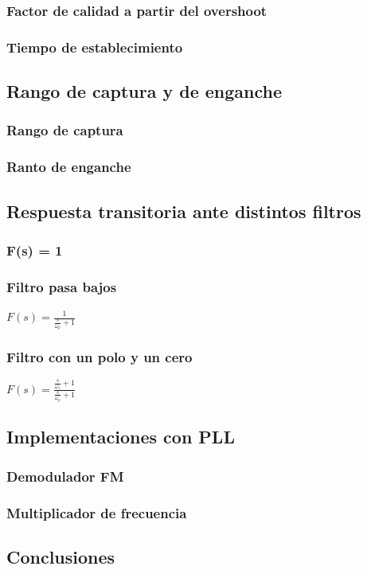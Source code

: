 	\subsubsection{Factor de calidad a partir del overshoot}

	\subsubsection{Tiempo de establecimiento}

\subsection{Rango de captura y de enganche}

	\subsubsection{Rango de captura}

	\subsubsection{Ranto de enganche}

\subsection{Respuesta transitoria ante distintos filtros}

	\subsubsection{F(s) = 1}
		
	\subsubsection{Filtro pasa bajos}
	
	$F(s) = \frac{1}{\frac{s}{\omega_p} + 1}$
	
	\subsubsection{Filtro con un polo y un cero}
	$F(s) = \frac{\frac{s}{\omega_z} + 1}{\frac{s}{\omega_p} + 1}$

\subsection{Implementaciones con PLL}

	\subsubsection{Demodulador FM }
	
	\subsubsection{Multiplicador de frecuencia}

\subsection{Conclusiones}
